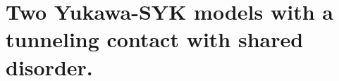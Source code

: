 \begin{figure}[t]
{        %
        }
    \label{fig:Schematic Phase diagram}
\end{figure}





\section{Two Yukawa-SYK models with a tunneling contact with shared disorder.}
\label{sec:model}

